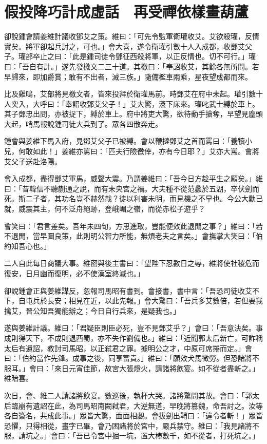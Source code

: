 
\chapter{假投降巧計成虛話　再受禪依樣畫葫蘆}

卻說鍾會請姜維計議收鄧艾之策。維曰：「可先令監軍衛瓘收艾。艾欲殺瓘，反情實矣。將軍卻起兵討之，可也。」會大喜，遂令衛瓘引數十人入成都，收鄧艾父子。瓘部卒止之曰：「此是鍾司徒令鄧征西殺將軍，以正反情也。切不可行。」瓘曰：「吾自有計。」遂先發檄文二三十道。其檄曰：「奉詔收艾，其餘各無所問。若早歸來，即加爵賞；敢有不出者，滅三族。」隨備檻車兩乘，星夜望成都而來。

比及雞鳴，艾部將見檄文者，皆來投拜於衛瓘馬前。時鄧艾在府中未起。瓘引數十人突入，大呼曰：「奉詔收鄧艾父子！」艾大驚，滾下床來。瓘叱武士縛於車上。其子鄧忠出問，亦被捉下，縛於車上。府中將吏大驚，欲待動手搶奪，早望見塵頭大起，哨馬報說鍾司徒大兵到了。眾各四散奔走。

鍾會與姜維下馬入府，見鄧艾父子已被縛。會以鞭撻鄧艾之首而罵曰：「養犢小兒，何敢如此！」姜維亦罵曰：「匹夫行險徼倖，亦有今日耶？」艾亦大罵。會將艾父子送赴洛陽。

會入成都，盡得鄧艾軍馬，威聲大震。乃謂姜維曰：「吾今日方趁平生之願矣。」維曰：「昔韓信不聽蒯通之說，而有未央宮之禍。大夫種不從范蠡於五湖，卒伏劍而死。斯二子者，其功名豈不赫然哉？徒以利害未明，而見機之不早也。今公大勳已就，威震其主，何不泛舟絕跡，登峨嵋之嶺，而從赤松子遊乎？

會笑曰：「君言差矣。吾年未四旬，方思進取，豈能便效此退閒之事？」維曰：「若不退閒，當早圖良策，此則明公智力所能，無煩老夫之言矣。」會撫掌大笑曰：「伯約知吾心也。」

二人自此每日商議大事。維密與後主書曰：「望陛下忍數日之辱，維將使社稷危而復安，日月幽而復明，必不使漢室終滅也。」

卻說鍾會正與姜維謀反，忽報司馬昭有書到。會接書，書中言：「吾恐司徒收艾不下，自屯兵於長安；相見在近，以此先報。」會大驚曰：「吾兵多艾數倍，若但要我擒艾，晉公知吾獨能辦之；今日自行兵來，是疑我也。」

遂與姜維計議。維曰：「君疑臣則臣必死，豈不見鄧艾乎？」會曰：「吾意決矣。事成則得天下，不成則退西蜀，亦不失作劉備也。」維曰：「近聞郭太后新亡，可詐稱太后有遺詔，教討司馬昭，以正弒君之罪。據明公之才，中原可席捲而定。」會曰：「伯約當作先鋒。成事之後，同享富貴。」維曰：「願效犬馬微勞。但恐諸將不服耳。」會曰：「來日元宵佳節，故宮大張燈火，請諸將飲宴。如不從者盡斬之。」維暗喜。

次日，會、維二人請諸將飲宴。數巡後，執杯大哭。諸將驚問其故。會曰：「郭太后臨崩有遺詔在此，為司馬昭南闕弒君，大逆無道，早晚將篡魏，命吾討之。汝等各自簽名，共成此事。」眾皆大驚，面面相覷。會拔劍出鞘曰：「違令者斬！」眾皆恐懼，只得相從，畫字已畢，會乃困諸將於宮中，嚴兵禁守。維曰：「我見諸將不服，請坑之。」會曰：「吾已令宮中掘一坑，置大棒數千，如不從者，打死坑之。」

